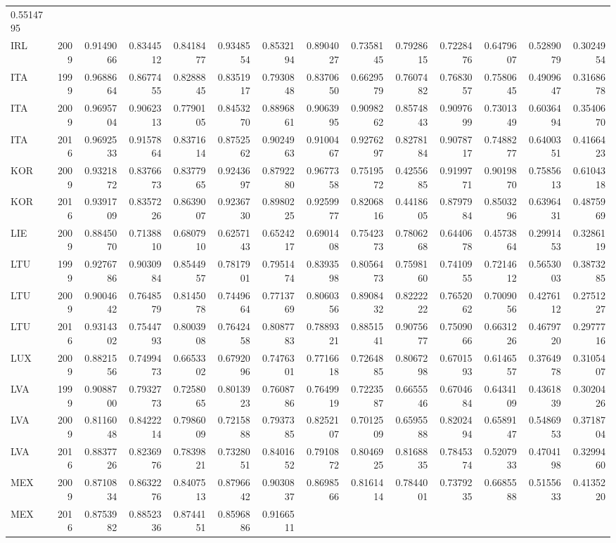 \documentclass[]{article}
\begin{document}
\begin{longtable}[]{@{}lrrrrrrrrrrrrr@{}}
0.5514795\tabularnewline
IRL & 2009 & 0.9149066 & 0.8344512 & 0.8418477 & 0.9348554 & 0.8532194 &
0.8904027 & 0.7358145 & 0.7928615 & 0.7228476 & 0.6479607 & 0.5289079 &
0.3024954\tabularnewline
ITA & 1999 & 0.9688664 & 0.8677455 & 0.8288845 & 0.8351917 & 0.7930848 &
0.8370650 & 0.6629579 & 0.7607482 & 0.7683057 & 0.7580645 & 0.4909647 &
0.3168678\tabularnewline
ITA & 2009 & 0.9695704 & 0.9062313 & 0.7790105 & 0.8453270 & 0.8896861 &
0.9063995 & 0.9098262 & 0.8574843 & 0.9097699 & 0.7301349 & 0.6036494 &
0.3540670\tabularnewline
ITA & 2016 & 0.9692533 & 0.9157864 & 0.8371614 & 0.8752562 & 0.9024963 &
0.9100467 & 0.9276297 & 0.8278184 & 0.9078717 & 0.7488277 & 0.6400351 &
0.4166423\tabularnewline
KOR & 2009 & 0.9321872 & 0.8376673 & 0.8377965 & 0.9243697 & 0.8792280 &
0.9677358 & 0.7519572 & 0.4255685 & 0.9199771 & 0.9019870 & 0.7585613 &
0.6104318\tabularnewline
KOR & 2016 & 0.9391709 & 0.8357226 & 0.8639007 & 0.9236730 & 0.8980225 &
0.9259977 & 0.8206816 & 0.4418605 & 0.8797984 & 0.8503296 & 0.6396431 &
0.4875969\tabularnewline
LIE & 2009 & 0.8845070 & 0.7138810 & 0.6807910 & 0.6257143 & 0.6524217 &
0.6901408 & 0.7542373 & 0.7806268 & 0.6440678 & 0.4573864 & 0.2991453 &
0.3286119\tabularnewline
LTU & 1999 & 0.9276786 & 0.9030984 & 0.8544957 & 0.7817901 & 0.7951474 &
0.8393598 & 0.8056473 & 0.7598160 & 0.7410955 & 0.7214612 & 0.5653003 &
0.3873285\tabularnewline
LTU & 2009 & 0.9004642 & 0.7648579 & 0.8145078 & 0.7449664 & 0.7713769 &
0.8060356 & 0.8908432 & 0.8222222 & 0.7652062 & 0.7009056 & 0.4276112 &
0.2751227\tabularnewline
LTU & 2016 & 0.9314302 & 0.7544793 & 0.8003908 & 0.7642458 & 0.8087783 &
0.7889321 & 0.8851541 & 0.9075677 & 0.7509066 & 0.6631226 & 0.4679720 &
0.2977716\tabularnewline
LUX & 2009 & 0.8821556 & 0.7499473 & 0.6653302 & 0.6792096 & 0.7476301 &
0.7716618 & 0.7264885 & 0.8067298 & 0.6701593 & 0.6146557 & 0.3764978 &
0.3105407\tabularnewline
LVA & 1999 & 0.9088700 & 0.7932773 & 0.7258065 & 0.8013923 & 0.7608786 &
0.7649919 & 0.7223587 & 0.6655546 & 0.6704684 & 0.6434109 & 0.4361839 &
0.3020426\tabularnewline
LVA & 2009 & 0.8116048 & 0.8422214 & 0.7986009 & 0.7215888 & 0.7937385 &
0.8252107 & 0.7012509 & 0.6595588 & 0.8202494 & 0.6589147 & 0.5486953 &
0.3718704\tabularnewline
LVA & 2016 & 0.8837726 & 0.8236976 & 0.7839821 & 0.7328051 & 0.8401652 &
0.7910872 & 0.8046925 & 0.8168835 & 0.7845374 & 0.5207933 & 0.4704198 &
0.3299460\tabularnewline
MEX & 2009 & 0.8710834 & 0.8632276 & 0.8407513 & 0.8796642 & 0.9030837 &
0.8698566 & 0.8161414 & 0.7844001 & 0.7379235 & 0.6685588 & 0.5155633 &
0.4135220\tabularnewline
MEX & 2016 & 0.8753982 & 0.8852336 & 0.8744151 & 0.8596886 & 0.9166511 &

\end{longtable}
\end{document}
